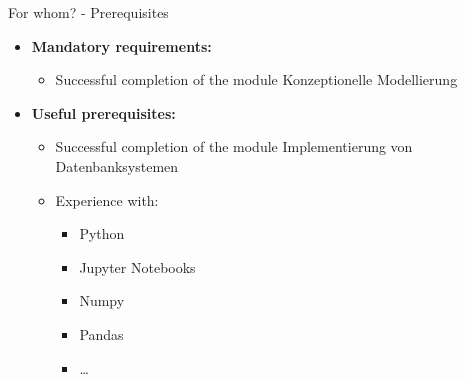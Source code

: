 \begin{frame}{For whom? - Prerequisites}
	\begin{itemize}
		\item \textbf{Mandatory requirements:}
		      \begin{itemize}
			      \item Successful completion of the module \glqq Konzeptionelle Modellierung\grqq
		      \end{itemize}
		\item \textbf{Useful prerequisites:}
		      \begin{itemize}
			      \item Successful completion of the module \glqq Implementierung von Datenbanksystemen\grqq
			      \item Experience with:
			            \begin{itemize}
				            \item Python
				            \item Jupyter Notebooks
				            \item Numpy
				            \item Pandas
				            \item \ldots
			            \end{itemize}
		      \end{itemize}
	\end{itemize}

\end{frame}


